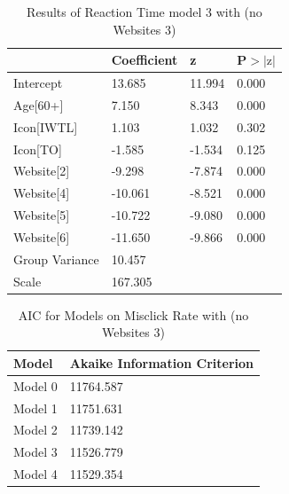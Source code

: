 \documentclass[12pt,twoside]{reedthesis}
\begin{document}
\begin{table}[h!]
        \centering
        \begin{tabular}{| p{5cm} | p{2.5cm} | p{2.5cm} | p{2.5cm} |}
            \hline
            & Coefficient & z & P$>|\text{z}|$\\
            \hline
            Intercept & 13.685 & 11.994 & 0.000\\
            \hline
            Age[60+] & 7.150 & 8.343 & 0.000\\
            \hline
            Icon[IWTL] & 1.103 & 1.032 & 0.302\\
            \hline
            Icon[TO] & -1.585 & -1.534 & 0.125\\
            \hline
            Website[2] & -9.298 & -7.874 & 0.000\\
            \hline
            Website[4] & -10.061 & -8.521 & 0.000\\
            \hline
            Website[5] & -10.722 & -9.080 & 0.000\\
            \hline
            Website[6] & -11.650 & -9.866 & 0.000\\
            \hline
            Group Variance & 10.457 &&\\
            \hline
            Scale & 167.305 &&\\
            \hline
        \end{tabular}
        \caption{Results of Reaction Time model 3 with (no Websites 3)}
    \end{table}

\begin{table}[h!]
        \centering
        \begin{tabular}{| p{3.5cm} | p{7.5cm} |}
            \hline
            Model & Akaike Information Criterion\\
            \hline
            Model 0 & 11764.587\\
            \hline
            Model 1 & 11751.631\\
            \hline
            Model 2 & 11739.142\\
            \hline
            Model 3 & 11526.779\\
            \hline
            Model 4 & 11529.354\\
            \hline
        \end{tabular}
        \caption{AIC for Models on Misclick Rate with (no Websites 3)}
    \end{table}
\end{document}
